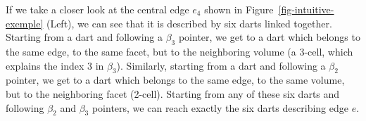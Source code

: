If we take a closer look at the central edge $e_4$ shown in
Figure~\ref{fig-intuitive-exemple} (Left), we can see that it is
described by six darts linked together.  Starting from a dart and
following a $\beta_3$ pointer, we get to a dart which belongs to the
same edge, to the same facet, but to the neighboring volume (a 3-cell,
which explains the index $3$ in $\beta_3$).  Similarly, starting from
a dart and following a $\beta_2$ pointer, we get to a dart which
belongs to the same edge, to the same volume, but to the neighboring
facet (2-cell). Starting from any of these six darts and following
$\beta_2$ and $\beta_3$ pointers, we can reach exactly the six darts
describing edge $e$.
%
%
\def\LargFig{.3\textwidth}
